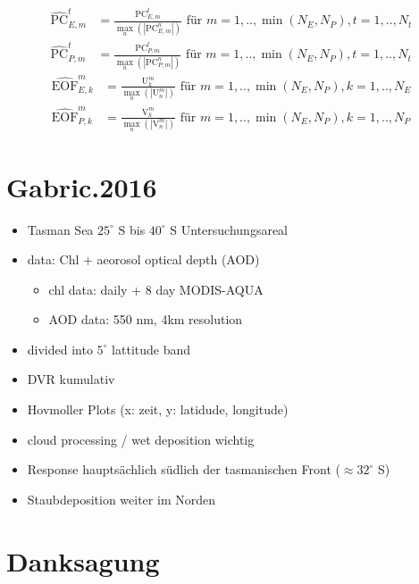 \documentclass[12pt,a4paper,onecolumn,draft]{scrartcl}
\begin{document}
\begin{align}
\widehat{\text{PC}}_{E,m}^t &= \frac{\text{PC}_{E,m}^t}{\max\limits_n(|\text{PC}_{E,m}^n|)} \text{ für } m = 1,..,\min(N_E,N_P), t = 1,..,N_t \\
\widehat{\text{PC}}_{P,m}^t &= \frac{\text{PC}_{P,m}^t}{\max\limits_n(|\text{PC}_{P,m}^n|)} \text{ für } m = 1,..,\min(N_E,N_P), t = 1,..,N_t
\end{align}
\begin{align}
\widehat{\text{EOF}}_{E,k}^m &= \frac{\text{U}_{k}^m}{\max\limits_n(|\text{U}_{n}^m|)} \text{ für } m = 1,..,\min(N_E,N_P), k = 1,..,N_E \\
\widehat{\text{EOF}}_{P,k}^m &= \frac{\text{V}_{k}^m}{\max\limits_n(|\text{V}_{n}^m|)} \text{ für } m = 1,..,\min(N_E,N_P), k = 1,..,N_P 
\end{align}

\section{Gabric.2016}

\begin{itemize}
\item Tasman Sea $25^\circ$ S bis $40^\circ$ S Untersuchungsareal
\item data: Chl + aeorosol optical depth (AOD)
\begin{itemize}
\item chl data: daily + 8 day MODIS-AQUA
\item AOD data: 550 nm, 4km resolution
\end{itemize}
\item divided into $5^\circ$ lattitude band
\item DVR kumulativ
\item Hovmoller Plots (x: zeit, y: latidude, longitude)
\item cloud processing / wet deposition wichtig
\item Response hauptsächlich südlich der tasmanischen Front ($\approx 32^\circ$ S)
\item Staubdeposition weiter im Norden
\end{itemize}

\listoffigures
{}
\listoftables
\section{Danksagung}
\nocite{*}
\end{document}
